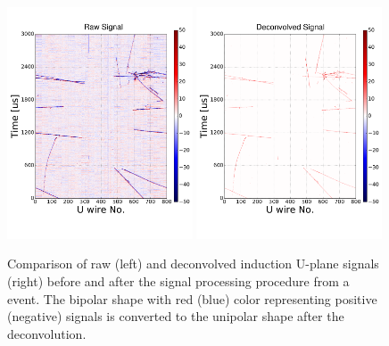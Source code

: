 

\begin{figure}[ht]
\centering
\includegraphics[width=0.49\textwidth]{graphics/IntroFigures/Fig_05a_protodune_raw_u.pdf}
\includegraphics[width=0.49\textwidth]{graphics/IntroFigures/Fig_05b_protodune_decon_u.pdf}
\caption{Comparison of raw (left) and deconvolved induction U-plane signals (right) before and after 
the signal processing procedure from a  event. The bipolar shape with red (blue) color representing
positive (negative) signals is converted to the unipolar shape after the \twod deconvolution.}
\label{deconvolution}
\end{figure}


